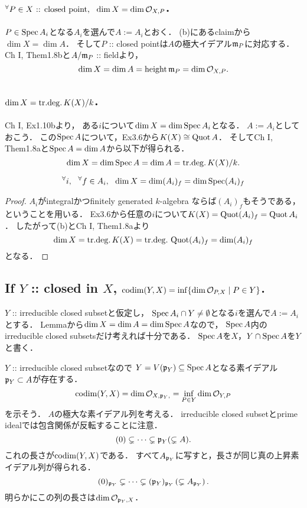 \documentclass[a4paper]{jsarticle}
\newcommand{\shO}{\mathcal{O}}
\begin{document}
    \subsection{$\Forall{P \in X\text{ :: closed point}} \dim X=\dim \shO_{X,P}$.}
    $P \in \operatorname{Spec} A_i$となる$A_i$を選んで$A:=A_i$とおく．
    (b)にあるclaimから$\dim X=\dim A$．
    そして$P$ :: closed pointは$A$の極大イデアル$\mathfrak{m}_P$に対応する．
    Ch I, Them1.8bと$A/\mathfrak{m}_P$ :: fieldより，
    \[ \dim X=\dim A=\height \I{m}_P=\dim \shO_{X,P}. \]

    \subsection{$\dim X=\mathrm{tr.deg.\,} K(X)/k$.}
    Ch I, Ex1.10bより，
    ある$i$について$\dim X=\dim \operatorname{Spec} A_i$となる．
    $A:=A_i$としておこう．
    この$\operatorname{Spec} A$について，Ex3.6から$K(X) \cong \operatorname{Quot} A$．
    そしてCh I, Them1.8aと$\operatorname{Spec} A=\dim A$から以下が得られる．
    \[ \dim X=\dim \operatorname{Spec} A=\dim A=\mathrm{tr.deg.\,} K(X)/k. \]

    \begin{Lemma}
    \[ {}^{\forall} i,~~ {}^{\forall} f \in A_i,~~ \dim X=\dim (A_i)_f=\dim \operatorname{Spec} (A_i)_f \] 
    \end{Lemma}
    \begin{proof}
        $A_i$がintegralかつfinitely generated $k$-algebra
        ならば$(A_i)_f$もそうである，ということを用いる．
        Ex3.6から任意の$i$について$K(X)=\operatorname{Quot} (A_i)_f=\operatorname{Quot} A_i$．
        したがって(b)とCh I, Them1.8aより
        \[ \dim X=\mathrm{tr.deg.\,} K(X)=\mathrm{tr.deg.\,} \operatorname{Quot} (A_i)_f=\dim (A_i)_f \]
        となる．
    \end{proof}

    \subsection{If $Y$ :: closed in $X$, $\codim(Y,X)=\inf\{\dim \shO_{P,X} \mid P \in Y\}$.}
    $Y$ :: irreducible closed subsetと仮定し，
    $\operatorname{Spec} A_i \cap Y \neq \emptyset$となる$i$を選んで$A:=A_i$とする．
    Lemmaから$\dim X=\dim A=\dim \operatorname{Spec} A$なので，
    $\operatorname{Spec} A$内のirreducible closed subsetsだけ考えれば十分である．
    $\operatorname{Spec} A$を$X$，$Y \cap \operatorname{Spec} A$を$Y$と書く．

    $Y$ :: irreducible closed subsetなので
    $Y=V(\mathfrak{p}_Y) \subseteq \operatorname{Spec} A$となる素イデアル$\mathfrak{p}_Y \subset A$が存在する．
    \[ \codim(Y,X)=\dim \shO_{X, \I{p}_Y,}=\inf_{P \in Y} \dim \shO_{Y,P} \]を示そう．
    $A$の極大な素イデアル列を考える．
    irreducible closed subsetとprime idealでは包含関係が反転することに注意．
    \[ (0) \subsetneq \dots \subsetneq \mathfrak{p}_Y (\subsetneq A). \]
    これの長さが$\operatorname{codim}(Y,X)$である．
    すべて$A_{\mathfrak{p}_Y}$に写すと，長さが同じ真の上昇素イデアル列が得られる．
    \[ (0)_{\mathfrak{p}_Y} \subsetneq \dots \subsetneq (\mathfrak{p}_Y)_{\mathfrak{p}_Y} \left(\subsetneq A_{\mathfrak{p}_Y} \right). \]
    明らかにこの列の長さは$\dim \shO_{\I{p}_Y, X}$．
\end{document}
